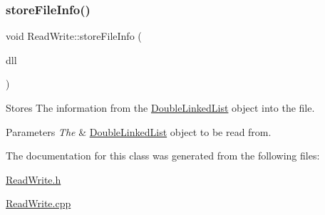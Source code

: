 \subsubsection{\texorpdfstring{store\+File\+Info()}{storeFileInfo()}}
{\footnotesize\ttfamily void Read\+Write\+::store\+File\+Info (\begin{DoxyParamCaption}\item[{\hyperlink{class_double_linked_list}{Double\+Linked\+List} $\ast$}]{dll }\end{DoxyParamCaption})}



Stores The information from the \hyperlink{class_double_linked_list}{Double\+Linked\+List} object into the file. 


\begin{DoxyParams}{Parameters}
{\em The} & \hyperlink{class_double_linked_list}{Double\+Linked\+List} object to be read from. \\
\hline
\end{DoxyParams}


The documentation for this class was generated from the following files\+:\begin{DoxyCompactItemize}
\item 
\hyperlink{_read_write_8h}{Read\+Write.\+h}\item 
\hyperlink{_read_write_8cpp}{Read\+Write.\+cpp}\end{DoxyCompactItemize}
